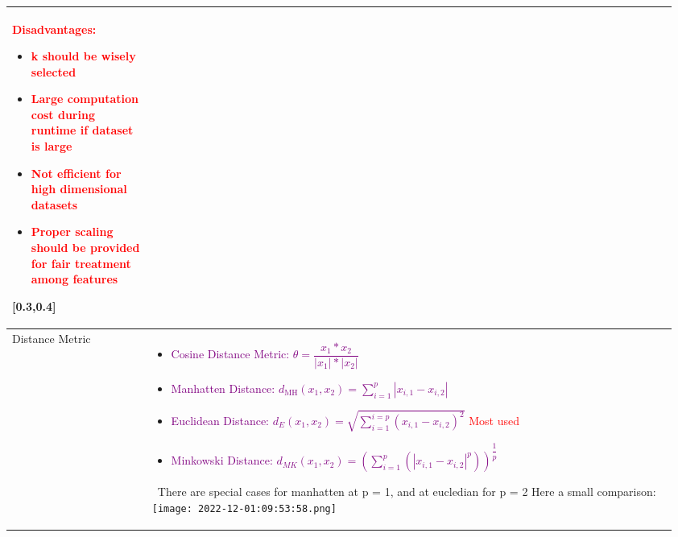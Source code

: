 \documentclass[main.tex,fontsize=8pt,paper=a4,paper=portrait,DIV=calc,]{scrartcl}
\begin{document}
\begin{table}[ht!]
\begin{tabular}{|m{0.2\linewidth}|m{0.755\linewidth}|}
{}{
\textcolor{red}{Disadvantages:}\newline
\begin{itemize}
\item \textcolor{red}{k should be wisely selected}
\item \textcolor{red}{Large computation cost during runtime if dataset is large}
\item \textcolor{red}{Not efficient for high dimensional datasets}
\item \textcolor{red}{Proper scaling should be provided for fair treatment among features}
\end{itemize} 
}[0.3,0.4]
\\ 
\hline
Distance Metric &
\vspace{2mm}
\large
\begin{itemize}
  \item \textcolor{purple}{Cosine Distance Metric: \( \theta = \dfrac{x_1 * x_2}{|x_1| * |x_2|} \)}\newline
    \, \newline
  \item \textcolor{purple}{Manhatten Distance: \( d_\text{MH}(x_1,x_2)= \sum_{i=1}^{p} | x_{i,1} - x_{i,2} | \)}\newline
    \, \newline
  \item \textcolor{purple}{Euclidean Distance: \( d_E(x_1,x_2) = \sqrt{\sum_{i=1}^{i=p}(x_{i,1} - x_{i,2})^2} \)}\newline
    \textcolor{red}{Most used}
  \item \textcolor{purple}{Minkowski Distance: \( d_{MK}(x_1,x_2) = (\sum_{i=1}^{p}(|x_{i,1} - x_{i,2}|^p))^{\dfrac{1}{p}} \)}
\vspace{-3mm}
\end{itemize} 
\normalsize \, \newline
There are special cases for manhatten at p = 1, and at eucledian for p = 2\newline
Here a small comparison: \newline
\texttt{[image: 2022-12-01:09:53:58.png]}\\
\hline
\end{tabular}
\end{table}
\pagebreak
\end{document}
